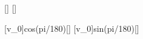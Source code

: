 [\mps]
[\degree]

[v_0\cos\alpha]{\vabX*cos(\alX*pi/180)}[\mps]
[v_0\sin\alpha]{\vabX*sin(\alX*pi/180)}[\mps]
